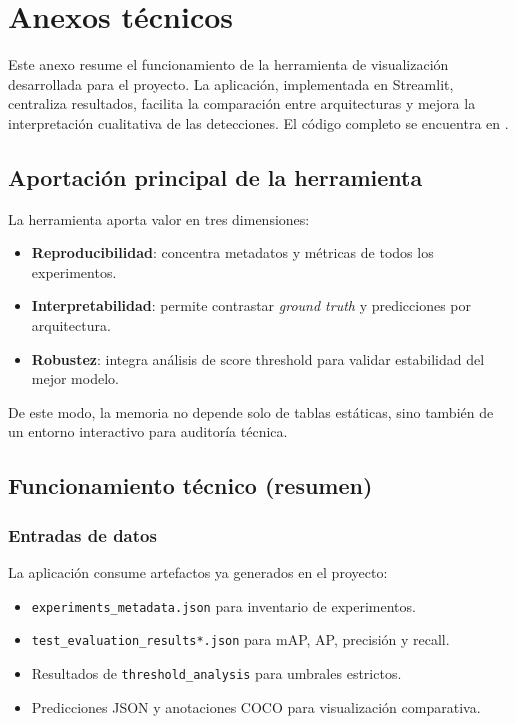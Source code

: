 \chapter{Anexos técnicos}
\label{ch:anexos}

Este anexo resume el funcionamiento de la herramienta de visualización desarrollada para el proyecto. La aplicación, implementada en \acrshort{Streamlit}, centraliza resultados, facilita la comparación entre arquitecturas y mejora la interpretación cualitativa de las detecciones. El código completo se encuentra en \thegitrepo{}.

\section{Aportación principal de la herramienta}
\label{sec:anexo_aportacion}

La herramienta aporta valor en tres dimensiones:
\begin{itemize}
    \item \textbf{Reproducibilidad}: concentra metadatos y métricas de todos los experimentos.
    \item \textbf{Interpretabilidad}: permite contrastar \textit{ground truth} y predicciones por arquitectura.
    \item \textbf{Robustez}: integra análisis de score threshold para validar estabilidad del mejor modelo.
\end{itemize}

De este modo, la memoria no depende solo de tablas estáticas, sino también de un entorno interactivo para auditoría técnica.

\section{Funcionamiento técnico (resumen)}
\label{sec:anexo_funcionamiento}

\subsection{Entradas de datos}

La aplicación consume artefactos ya generados en el proyecto:
\begin{itemize}
    \item \texttt{experiments\_metadata.json} para inventario de experimentos.
    \item \texttt{test\_evaluation\_results*.json} para mAP, AP, precisión y recall.
    \item Resultados de \texttt{threshold\_analysis} para umbrales estrictos.
    \item Predicciones JSON y anotaciones COCO para visualización comparativa.
\end{itemize}

